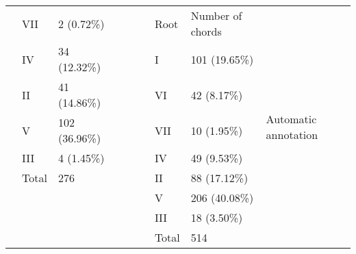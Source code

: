 \begin{table}[]
{\begin{tabular}{lllll|l|l|l|l|}
\multicolumn{1}{|l|}{} & \multicolumn{1}{l|}{VII} & \multicolumn{1}{l|}{2 (0.72\%)} & \multicolumn{1}{l|}{} &  &  & Root & Number of chords & \multirow{9}{*}{Automatic annotation} \\ \cline{2-3} \cline{7-8}
\multicolumn{1}{|l|}{} & \multicolumn{1}{l|}{IV} & \multicolumn{1}{l|}{34 (12.32\%)} & \multicolumn{1}{l|}{} &  &  & I & 101 (19.65\%) &  \\ \cline{2-3} \cline{7-8}
\multicolumn{1}{|l|}{} & \multicolumn{1}{l|}{II} & \multicolumn{1}{l|}{41 (14.86\%)} & \multicolumn{1}{l|}{} &  &  & VI & 42 (8.17\%) &  \\ \cline{2-3} \cline{7-8}
\multicolumn{1}{|l|}{} & \multicolumn{1}{l|}{V} & \multicolumn{1}{l|}{102 (36.96\%)} & \multicolumn{1}{l|}{} &  &  & VII & 10 (1.95\%) &  \\ \cline{2-3} \cline{7-8}
\multicolumn{1}{|l|}{} & \multicolumn{1}{l|}{III} & \multicolumn{1}{l|}{4 (1.45\%)} & \multicolumn{1}{l|}{} &  &  & IV & 49 (9.53\%) &  \\ \cline{2-3} \cline{7-8}
\multicolumn{1}{|l|}{} & \multicolumn{1}{l|}{Total} & \multicolumn{1}{l|}{276} & \multicolumn{1}{l|}{} &  &  & II & 88 (17.12\%) &  \\ \cline{1-4} \cline{7-8}
 &  &  &  &  &  & V & 206 (40.08\%) &  \\ \cline{7-8}
 &  &  &  &  &  & III & 18 (3.50\%) &  \\ \cline{7-8}
 &  &  &  &  &  & Total & 514 &  \\ \cline{6-9}
\end{tabular}
}
\label{my-label}
\end{table}



